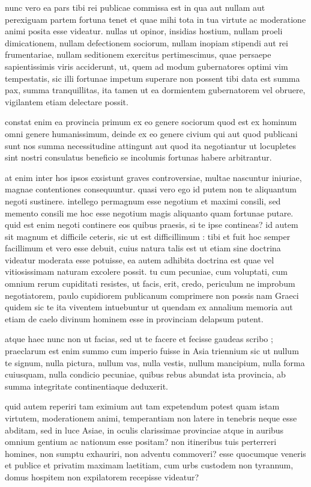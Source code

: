  nunc vero ea pars tibi rei publicae commissa est in qua aut nullam aut perexiguam partem fortuna tenet et quae mihi tota in tua virtute ac moderatione animi posita esse videatur. nullas ut opinor, insidias hostium, nullam proeli dimicationem, nullam defectionem sociorum, nullam inopiam stipendi aut rei frumentariae, nullam seditionem exercitus pertimescimus, quae persaepe sapientissimis viris acciderunt, ut, quem ad modum gubernatores optimi vim tempestatis, sic illi fortunae impetum superare non possent tibi data est summa pax, summa tranquillitas, ita tamen ut ea dormientem gubernatorem vel obruere, vigilantem etiam delectare possit.

 constat enim ea provincia primum ex eo genere sociorum quod est ex hominum omni genere humanissimum, deinde ex eo genere civium qui aut quod publicani sunt nos summa necessitudine attingunt aut quod ita negotiantur ut locupletes sint nostri consulatus beneficio se incolumis fortunas habere arbitrantur.

 at enim inter hos ipsos exsistunt graves controversiae, multae nascuntur iniuriae, magnae contentiones consequuntur. quasi vero ego id putem non te aliquantum negoti sustinere. intellego permagnum esse negotium et maximi consili, sed memento consili me hoc esse negotium magis aliquanto quam fortunae putare. quid est enim negoti continere eos quibus praesis, si te ipse contineas? id autem sit magnum et difficile ceteris, sic ut est difficillimum : tibi et fuit hoc semper facillimum et vero esse debuit, cuius natura talis est ut etiam sine doctrina videatur moderata esse potuisse, ea autem adhibita doctrina est quae vel vitiosissimam naturam excolere possit. tu cum pecuniae, cum voluptati, cum omnium rerum cupiditati resistes, ut facis, erit, credo, periculum ne improbum negotiatorem, paulo cupidiorem publicanum comprimere non possis nam Graeci quidem sic te ita viventem intuebuntur ut quendam ex annalium memoria aut etiam de caelo divinum hominem esse in provinciam delapsum putent.

 atque haec nunc non ut facias, sed ut te facere et fecisse gaudeas scribo ; praeclarum est enim summo cum imperio fuisse in Asia triennium sic ut nullum te signum, nulla pictura, nullum vas, nulla vestis, nullum mancipium, nulla forma cuiusquam, nulla condicio pecuniae, quibus rebus abundat ista provincia, ab summa integritate continentiaque deduxerit.

 quid autem reperiri tam eximium aut tam expetendum potest quam istam virtutem, moderationem animi, temperantiam non latere in tenebris neque esse abditam, sed in luce Asiae, in oculis clarissimae provinciae atque in auribus omnium gentium ac nationum esse positam? non itineribus tuis perterreri homines, non sumptu exhauriri, non adventu commoveri? esse quocumque veneris et publice et privatim maximam laetitiam, cum urbs custodem non tyrannum, domus hospitem non expilatorem recepisse videatur?


